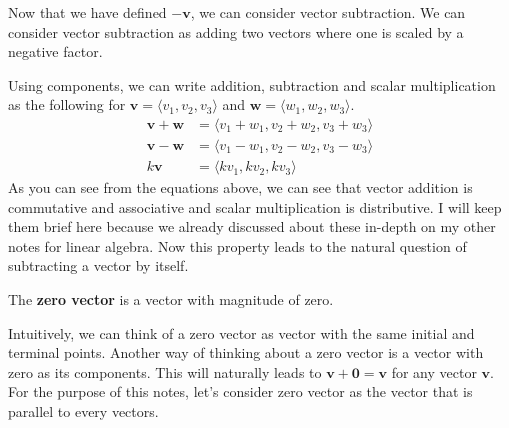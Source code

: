 \documentclass[../../../main.tex]{subfiles}
\begin{document}
Now that we have defined $-\mathbf{v}$, we can consider vector
subtraction. We can consider vector subtraction as adding two vectors
where one is scaled by a negative factor.

\begin{figure}[H]
\centering
{}
\end{figure}

Using components, we can write addition, subtraction and scalar
multiplication as the following for $\mathbf{v} = \langle v_1, v_2,
v_3 \rangle$ and $\mathbf{w} = \langle w_1, w_2, w_3 \rangle$.
\begin{align*}
    \mathbf{v} + \mathbf{w}
    &= \langle v_1 + w_1, v_2 + w_2, v_3 + w_3 \rangle \\
    \mathbf{v} - \mathbf{w}
    &= \langle v_1 - w_1, v_2 - w_2, v_3 - w_3 \rangle \\
    k\mathbf{v}
    &= \langle kv_1, kv_2, kv_3 \rangle
\end{align*}
As you can see from the equations above, we can see that vector
addition is commutative and associative and scalar multiplication is
distributive. I will keep them brief here because we already discussed
about these in-depth on my other notes for linear algebra. Now this
property leads to the natural question of subtracting a vector by
itself.

\begin{definition}{}{}
The \textbf{zero vector} is a vector with magnitude of zero.
\end{definition}

Intuitively, we can think of a zero vector as vector with the same
initial and terminal points. Another way of thinking about a zero
vector is a vector with zero as its components. This will naturally
leads to $\mathbf{v} + \mathbf{0} = \mathbf{v}$ for any vector
$\mathbf{v}$. For the purpose of this notes, let's consider zero
vector as the vector that is parallel to every vectors.
\end{document}
